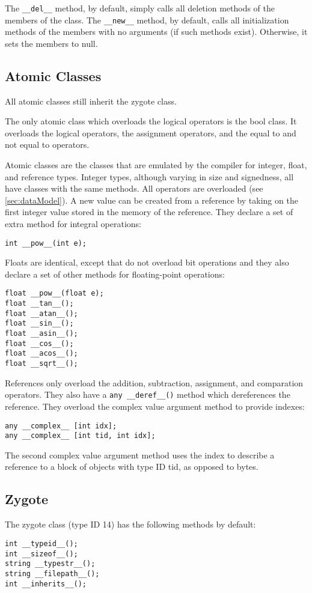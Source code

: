 \documentclass[10pt,a4paper]{article}
\begin{document}
The \verb|__del__| method, by default, simply calls all deletion methods of the members of the class. The \verb|__new__| method, by default, calls all initialization methods of the members with no arguments (if such methods exist). Otherwise, it sets the members to null.

\subsection{Atomic Classes}
All atomic classes still inherit the zygote class. 

The only atomic class which overloads the logical operators is the bool class. It overloads the logical operators, the assignment operators, and the equal to and not equal to operators.

Atomic classes are the classes that are emulated by the compiler for integer, float, and reference types. Integer types, although varying in size and signedness, all have classes with the same methods. All operators are overloaded (see \ref{sec:dataModel}). A new value can be created from a reference by taking on the first integer value stored in the memory of the reference. They declare a set of extra method for integral operations:
\begin{verbatim}
int __pow__(int e);
\end{verbatim}

Floats are identical, except that do not overload bit operations and they also declare a set of other methods for floating-point operations:
\begin{verbatim}
float __pow__(float e);
float __tan__();
float __atan__();
float __sin__();
float __asin__();
float __cos__();
float __acos__();
float __sqrt__();
\end{verbatim}

References only overload the addition, subtraction, assignment, and comparation operators. They also have a \verb|any __deref__()| method which dereferences the reference. They overload the complex value argument method to provide indexes:
\begin{verbatim}
any __complex__ [int idx];
any __complex__ [int tid, int idx];
\end{verbatim}

The second complex value argument method uses the index to describe a reference to a block of objects with type ID tid, as opposed to bytes. 

\subsection{Zygote}
The zygote class (type ID 14) has the following methods by default:
\begin{verbatim}
int __typeid__();
int __sizeof__();
string __typestr__();
string __filepath__();
int __inherits__();
\end{verbatim}
\end{document}
